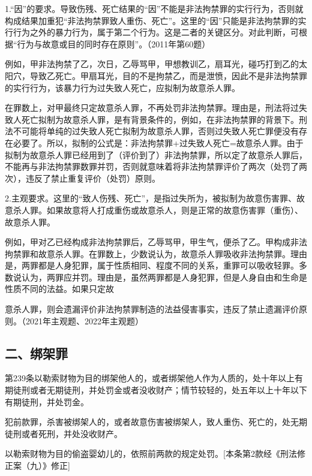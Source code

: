 1.“因”的要求。导致伤残、死亡结果的“因”不能是非法拘禁罪的实行行为，否则就构成结果加重犯“非法拘禁罪致人重伤、死亡”。这里的“因”只能是非法拘禁罪的实行行为之外的暴力行为，属于第二个行为。这是二者的关键区分。对此判断，可根据“行为与故意或目的同时存在原则”。（2011年第60题）

例如，甲非法拘禁了乙，次日，乙辱骂甲，甲想教训乙，扇耳光，碰巧打到乙的太阳穴，导致乙死亡。甲扇耳光，目的不是拘禁乙，而是泄愤，因此不是非法拘禁罪的实行行为，该暴力行为过失致人死亡，应拟制为故意杀人罪。

在罪数上，对甲最终只定故意杀人罪，不再处罚非法拘禁罪。理由是，刑法将过失致人死亡拟制为故意杀人罪，是有背景条件的，例如，在非法拘禁罪的背景下。刑法不可能将单纯的过失致人死亡拟制为故意杀人罪，否则过失致人死亡罪便没有存在必要了。所以，拟制的公式是：非法拘禁罪+过失致人死亡=故意杀人罪。由于拟制为故意杀人罪已经用到了（评价到了）非法拘禁罪，所以定了故意杀人罪后，不能再与非法拘禁罪数罪并罚，否则就意味着将非法拘禁罪评价了两次（处罚了两次），违反了禁止重复评价（处罚）原则。

2.主观要求。这里的“致人伤残、死亡”，是指过失所为，被拟制为故意伤害罪、故意杀人罪。如果故意将人打成重伤或故意杀人，则是正常的故意伤害罪（重伤）、故意杀人罪。

例如，甲对乙已经构成非法拘禁罪后，乙辱骂甲，甲生气，便杀了乙。甲构成非法拘禁罪和故意杀人罪。在罪数上，少数说认为，故意杀人罪吸收非法拘禁罪。理由是，两罪都是人身犯罪，属于性质相同、程度不同的关系，重罪可以吸收轻罪。多数说认为，两罪应并罚。理由是，虽然两罪都是人身犯罪，但是人身自由和生命是性质不同的法益。如果只定故

意杀人罪，则会遗漏评价非法拘禁罪制造的法益侵害事实，违反了禁止遗漏评价原则。（2021年主观题、2022年主观题）


\subsection*{二、绑架罪}

第239条以勒索财物为目的绑架他人的，或者绑架他人作为人质的，处十年以上有期徒刑或者无期徒刑，并处罚金或者没收财产；情节较轻的，处五年以上十年以下有期徒刑，并处罚金。

犯前款罪，杀害被绑架人的，或者故意伤害被绑架人，致人重伤、死亡的，处无期徒刑或者死刑，并处没收财产。

以勒索财物为目的偷盗婴幼儿的，依照前两款的规定处罚。[本条第2款经《刑法修正案（九）》修正]

